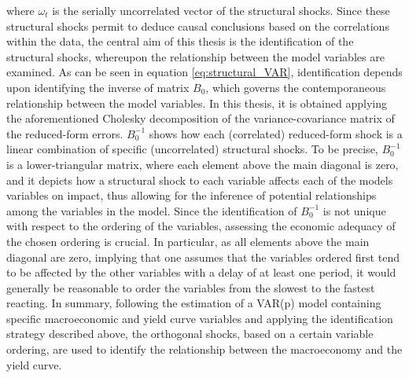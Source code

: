 
where $\omega_{t}$ is the serially uncorrelated vector of the structural shocks.
Since these structural shocks permit to deduce causal conclusions based on the correlations within the data, the central aim of this thesis is the identification of the structural shocks, whereupon the relationship between the model variables are examined. 
As can be seen in equation \ref{eq:structural_VAR}, identification depends upon identifying the inverse of matrix $B_{0}$, which governs the contemporaneous relationship between the model variables.
In this thesis, it is obtained applying the aforementioned Cholesky decomposition of the variance-covariance matrix of the reduced-form errors. 
$B^{-1}_{0}$ shows how each (correlated) reduced-form shock is a linear combination of specific (uncorrelated) structural shocks. 
To be precise, $B^{-1}_{0}$ is a lower-triangular matrix, where each element above the main diagonal is zero, and it depicts how a structural shock to each variable affects each of the models variables on impact, thus allowing for the inference of potential relationships among the variables in the model. 
Since the identification of $B^{-1}_{0}$ is not unique with respect to the ordering of the variables, assessing the economic adequacy of the chosen ordering is crucial. 
In particular, as all elements above the main diagonal are zero, implying that one assumes that the variables ordered first tend to be affected by the other variables with a delay of at least one period, it would generally be reasonable to order the variables from the slowest to the fastest reacting. 
In summary, following the estimation of a VAR(p) model containing specific macroeconomic and yield curve variables and applying the identification strategy described above, the orthogonal shocks, based on a certain variable ordering, are used to identify the relationship between the macroeconomy and the yield curve. 



